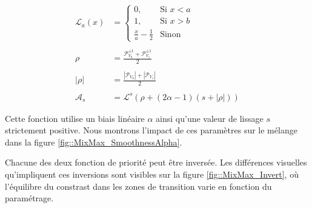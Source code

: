 \documentclass[9pt, twocolumn]{article} %
\begin{document}

\begin{equation}\label{A_base}
  \begin{split}
    \mathcal L_a(x) &=
    \begin{cases}
      0,                        & \text{Si } x < a \\
      1,                        & \text{Si } x > b \\
      \frac{x}{a} - \frac{1}{2} & \text{Sinon}
    \end{cases}
    \\
    \\
    \rho &= \frac{\mathcal{P}^{\pm 1}_{V_0} + \mathcal{P}^{\pm 1}_{V_1}}{2}
    \\
    \\
    |\rho| &= \frac{|\mathcal{P}_{V_0}| + |\mathcal{P}_{V_1}|}{2}
    \\
    \\
    \mathcal{A}_s &= \mathcal{L}^s\left(
    \rho + (2 \alpha - 1)(s + |\rho|)
    \right)
  \end{split}
\end{equation}

Cette fonction utilise un biais linéaire $\alpha$ ainsi qu'une valeur de
lissage $s$ strictement positive. Nous montrons l'impact de ces paramètres sur
le mélange dans la figure \ref{fig::MixMax_SmoothnessAlpha}.

Chacune des deux fonction de priorité peut être inversée. Les différences
visuelles qu'impliquent ces inversions sont visibles sur la figure
\ref{fig::MixMax_Invert}, où l'équilibre du constrast dans les zones de
transition varie en fonction du paramétrage.
\end{document}
